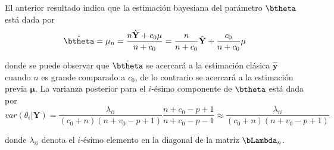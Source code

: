 El anterior resultado indica que la estimación bayesiana del parámetro $\btheta$ está dada por 
\begin{equation*}
\hat{\btheta}=\mathbf{\mu}_n=\dfrac{n\hat{\mathbf{Y}}+c_0\mathbf{\mu}}{n+c_0}=\dfrac{n}{n+c_0}\hat{\mathbf{Y}}+\dfrac{c_0}{n+c_0}\mathbf{\mu}
\end{equation*}

donde se puede observar que $\hat{\btheta}$ se acercará a la estimación clásica $\hat{\mathbf{y}}$ cuando $n$ es grande comparado a $c_0$, de lo contrario se acercará a la estimación previa $\mathbf{\mu}$. La varianza posterior para el $i$-ésimo componente de $\btheta$ está dada por 
\begin{equation*}
var(\theta_i|\mathbf{Y})=\dfrac{\lambda_{ii}}{(c_0+n)(n+v_0-p+1)}\dfrac{n+c_0-p+1}{n+c_0-p-1}\approx\dfrac{\lambda_{ii}}{(c_0+n)(n+v_0-p+1)}
\end{equation*}

donde $\lambda_{ii}$ denota el $i$-ésimo elemento en la diagonal de la matriz $\bLambda_n$.

